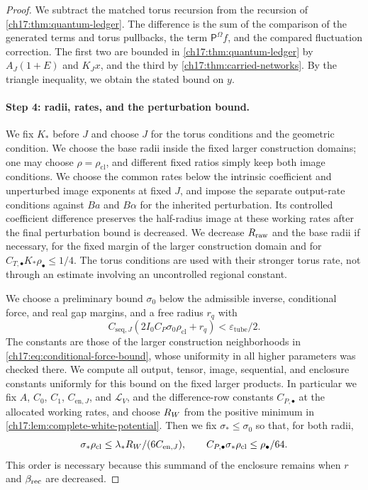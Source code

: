 \begin{proof}
We subtract the matched torus recursion from the recursion of \cref{ch17:thm:quantum-ledger}. The difference is the sum of the comparison of the generated terms and torus pullbacks, the term $\mathsf P^\Omega f$, and the compared fluctuation correction. The first two are bounded in \cref{ch17:thm:quantum-ledger} by $A_J(1+E)$ and $K_Jx$, and the third by \cref{ch17:thm:carried-networks}. By the triangle inequality, we obtain the stated bound on $y$.

\paragraph{Step 4: radii, rates, and the perturbation bound.}
We fix $K_*$ before $J$ and choose $J$ for the torus conditions and the geometric condition. We choose the base radii inside the fixed larger construction domains; one may choose $\rho=\rho_{\mathrm{cl}}$, and different fixed ratios simply keep both image conditions. We choose the common rates below the intrinsic coefficient and unperturbed image exponents at fixed $J$, and impose the separate output-rate conditions against $Ba$ and $B\alpha$ for the inherited perturbation. Its controlled coefficient difference preserves the half-radius image at these working rates after the final perturbation bound is decreased. We decrease $R_{\mathrm{raw}}$ and the base radii if necessary, for the fixed margin of the larger construction domain and for $C_{T,\bullet}K_*\rho_\bullet\le1/4$. The torus conditions are used with their stronger torus rate, not through an estimate involving an uncontrolled regional constant.

We choose a preliminary bound $\sigma_0$ below the admissible inverse, conditional force, and real gap margins, and a free radius $r_q$ with
\[
 C_{\mathrm{seq},J}(2I_0C_P\sigma_0\rho_{\mathrm{cl}}+r_q)<\varepsilon_{\mathrm{tube}}/2.
\]
The constants are those of the larger construction neighborhoods in \eqref{ch17:eq:conditional-force-bound}, whose uniformity in all higher parameters was checked there. We compute all output, tensor, image, sequential, and enclosure constants uniformly for this bound on the fixed larger products. In particular we fix $A$, $C_0$, $C_1$, $C_{\mathrm{en},J}$, and $\mathcal L_V$, and the difference-row constants $C_{P,\bullet}$ at the allocated working rates, and choose $R_W$ from the positive minimum in \cref{ch17:lem:complete-white-potential}. Then we fix $\sigma_*\le\sigma_0$ so that, for both radii,
\[
 \sigma_*\rho_{\mathrm{cl}}\le\lambda_*R_W/(6C_{\mathrm{en},J}),\qquad
 C_{P,\bullet}\sigma_*\rho_{\mathrm{cl}}\le\rho_\bullet/64.
\]
This order is necessary because this summand of the enclosure remains when $r$ and $\beta_{\mathrm{rec}}$ are decreased.


\end{proof}
